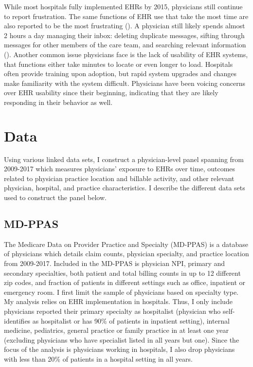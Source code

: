 \documentclass[11pt]{article}
\begin{document}
While most hospitals fully implemented EHRs by 2015, physicians still continue to report frustration. The same functions of EHR use that take the most time are also reported to be the most frustrating (\cite{dymek2021building}). A physician still likely spends almost 2 hours a day managing their inbox: deleting duplicate messages, sifting through messages for other members of the care team, and searching relevant information (\cite{dymek2021building}). Another common issue physicians face is the lack of usability of EHR systems, that functions either take minutes to locate or even longer to load. Hospitals often provide training upon adoption, but rapid system upgrades and changes make familiarity with the system difficult. Physicians have been voicing concerns over EHR usability since their beginning, indicating that they are likely responding in their behavior as well. 

\section{Data}

Using various linked data sets, I construct a physician-level panel spanning from 2009-2017 which measures physicians' exposure to EHRs over time, outcomes related to physician practice location and billable activity, and other relevant physician, hospital, and practice characteristics. I describe the different data sets used to construct the panel below.

\subsection{MD-PPAS}

The Medicare Data on Provider Practice and Specialty (MD-PPAS) is a database of physicians which details claim counts, physician specialty, and practice location from 2009-2017. Included in the MD-PPAS is physician NPI, primary and secondary specialties, both patient and total billing counts in up to 12 different zip codes, and fraction of patients in different settings such as office, inpatient or emergency room. I first limit the sample of physicians based on specialty type. My analysis relies on EHR implementation in hospitals. Thus, I only include physicians reported their primary specialty as hospitalist (physician who self-identifies as hospitalist or has 90\% of patients in inpatient setting), internal medicine, pediatrics, general practice or family practice in at least one year (excluding physicians who have specialist listed in all years but one). Since the focus of the analysis is physicians working in hospitals, I also drop physicians with less than 20\% of patients in a hospital setting in all years.
\end{document}
